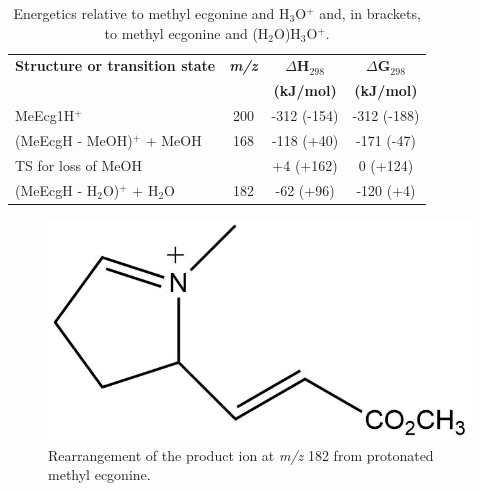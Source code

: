 \begin{table}[htbp]
\centering
\caption{Energetics relative to methyl ecgonine and H$_3$O$^+$ and, in brackets, to methyl ecgonine and (H$_2$O)H$_3$O$^+$. }
\label{tb:me2}
\begin{tabular}{lccc}
\toprule
\textbf{Structure or transition state}	&\textbf{\textit{m/z} } &\textbf{$\Delta$H$_{298}$} &\textbf{$\Delta$G$_{298}$}\\
& &	\textbf{(kJ/mol)} &\textbf{(kJ/mol)} \\  \toprule
MeEcg1H$^+$   				&	200	& -312 (-154)  & -312 (-188) \\ \midrule
(MeEcgH - MeOH)$^+$ + MeOH	&	168	& -118 (+40)  & -171 (-47)   \\ \midrule
TS for loss of MeOH			&		& +4 (+162)  	& 0 (+124)   		\\ \midrule
(MeEcgH - H$_2$O)$^+$ + H$_2$O	&	182	& -62 (+96)  & -120 (+4)   \\ 
\bottomrule
\end{tabular}
\end{table}


\begin{figure}[htbp]
\centering
\includegraphics[width=0.3\linewidth]{pics/cocaine-chapter/meecg_frag.png}
\caption{Rearrangement of the product ion at \textit{m/z} 182 from protonated methyl ecgonine.}
\label{fig:MeEcg_fragment}
\end{figure}





















